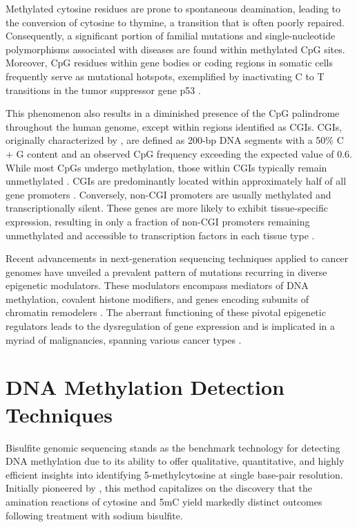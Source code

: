Methylated cytosine residues are prone to spontaneous deamination, leading to the conversion of cytosine to thymine, a transition that is often poorly repaired. Consequently, a significant portion of familial mutations and single-nucleotide polymorphisms associated with diseases are found within methylated CpG sites. Moreover, CpG residues within gene bodies or coding regions in somatic cells frequently serve as mutational hotspots, exemplified by inactivating C to T transitions in the tumor suppressor gene p53 \citep{meth_p53}.

This phenomenon also results in a diminished presence of the CpG palindrome throughout the human genome, except within regions identified as \acp{CGI}. \acsp{CGI}, originally characterized by \cite{cgi}, are defined as 200-bp DNA segments with a 50\% C + G content and an observed CpG frequency exceeding the expected value of 0.6. While most CpGs undergo methylation, those within \acsp{CGI} typically remain unmethylated \citep{cgi2}. \acsp{CGI} are predominantly located within approximately half of all gene promoters \citep{cgi3}. Conversely, non-\acs{CGI} promoters are usually methylated and transcriptionally silent. These genes are more likely to exhibit tissue-specific expression, resulting in only a fraction of non-CGI promoters remaining unmethylated and accessible to transcription factors in each tissue type \citep{meth_chrom}.

Recent advancements in next-generation sequencing techniques applied to cancer genomes have unveiled a prevalent pattern of mutations recurring in diverse epigenetic modulators. These modulators encompass mediators of DNA methylation, covalent histone modifiers, and genes encoding subunits of chromatin remodelers \citep{meth_cancer}. The aberrant functioning of these pivotal epigenetic regulators leads to the dysregulation of gene expression and is implicated in a myriad of malignancies, spanning various cancer types \citep{meth_cancer2}.

\section{DNA Methylation Detection Techniques}

Bisulfite genomic sequencing stands as the benchmark technology for detecting DNA methylation due to its ability to offer qualitative, quantitative, and highly efficient insights into identifying 5-methylcytosine at single base-pair resolution. Initially pioneered by \cite{bisulfite_ori}, this method capitalizes on the discovery that the amination reactions of cytosine and \acs{5mC} yield markedly distinct outcomes following treatment with sodium bisulfite.

